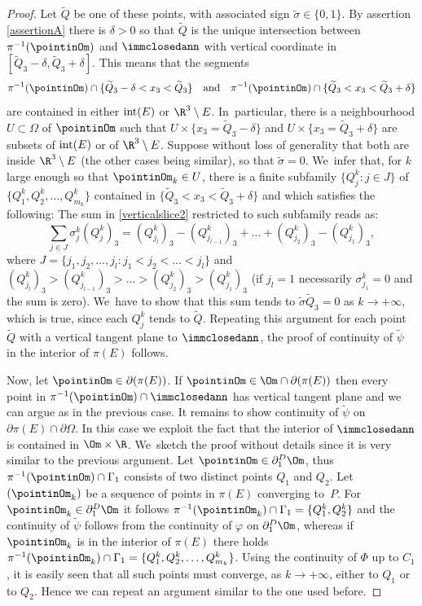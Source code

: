 \begin{proof}
Let $\widetilde Q$
be one of these points, with associated sign $\widetilde\sigma \in \{0,1\}$.
By assertion \ref{assertionA} there is $\delta>0$
so that $\widetilde Q$ is the unique intersection between $\pi^{-1}(\pointinOm)$ and
$\immclosedann$ with vertical coordinate in $[\widetilde Q_3-\delta,\widetilde Q_3+\delta]$.
This means that the segments
\[
\pi^{-1}(\pointinOm)\cap\{\widetilde Q_3-\delta<x_3<\widetilde Q_3\}\quad\text{and}\quad \pi^{-1}(\pointinOm)\cap\{\widetilde Q_3<x_3<\widetilde Q_3+\delta\}
\]
are contained in either $\textup{int}(E)$ or
$\R^3\setminus E$. In~particular,
there is a neighbourhood $U\subset\Omega$ of $\pointinOm$ such that $U\times \{x_3=\widetilde Q_3-\delta\}$ and $U\times \{x_3=\widetilde Q_3+\delta\}$ are
subsets of $\textup{int}(E)$ or of $\R^3\setminus E$. Suppose
without loss of generality that both are inside $\R^3\setminus E$ (the other cases being
similar),
so that $\widetilde \sigma=0$. We~infer that, for $k$ large enough so that $\pointinOm_k\in U$,
there is a finite subfamily $\{Q^k_j:j\in J\}$ of $\{Q^k_1,Q^k_2,\dots,Q^k_{m_k}\}$ contained in $\{ \widetilde Q_3<x_3<\widetilde Q_3+\delta\}$ and which satisfies the following: The sum in \eqref{verticalslice2} restricted to such subfamily reads as:
\[
 \sum_{j\in J}\sigma^k_j (Q^k_j)_3=(Q^k_{j_l})_3-(Q^k_{j_{l-1}})_3+\dots+(Q^k_{j_2})_3-(Q^k_{j_1})_3,
\]
where
$J=\{j_1,j_2,\dots,j_l : j_1<j_2<\dots<j_l\}$ and $(Q^k_{j_l})_3>(Q^k_{j_{l-1}})_3>\dots>(Q^k_{j_2})_3>(Q^k_{j_1})_3$ (if $j_l=1$ necessarily $\sigma_{j_1}^k=0$ and the sum is zero). We~have to show that this sum tends to $\widetilde\sigma \widetilde Q_3=0$ as $k\to
+\infty$, which is true, since each $Q^k_j$ tends to $\widetilde Q$.
Repeating this argument for each point $\widetilde Q$
with a vertical tangent plane to $\immclosedann$,
the proof of continuity of $\widetilde\psi$ in the interior of $\pi(E)$ follows.

Now, let
$\pointinOm\in\partial(\pi(E))$. If $\pointinOm\in \Om
\cap \partial(\pi(E))$
then every point in $\pi^{-1}(\pointinOm)\cap \immclosedann$ has vertical tangent plane
and we can argue as in the previous case.
It remains to show continuity of $\widetilde \psi$
on $\partial\pi(E)\cap \partial\Omega$. In this case we
exploit the fact that the interior of
$\immclosedann$ is contained in $\Om\times \R$. We~sketch the proof without details since it is very similar to the previous argument. Let
$\pointinOm\in \partial_1^D\Om$,
thus $\pi^{-1}(\pointinOm)\cap\Gamma_1$ consists of two distinct points
$Q_1$ and $Q_2$. Let $(\pointinOm_k)$
be a sequence of points in ${\pi(E)}$
converging to~$P$.
For $\pointinOm_k \in \partial^D_1\Om$ it follows $\pi^{-1}(\pointinOm_k)
\cap\Gamma_1=\{Q^k_1,Q^k_2\}$ and the continuity of $\widetilde\psi$
follows from the continuity of $\varphi$ on $\partial^D_1\Om$,
whereas if $\pointinOm_k$
is in the interior of $\pi(E)$ there holds $\pi^{-1}(\pointinOm_k)
\cap\Gamma_1=\{Q^k_1,Q^k_2,\dots, Q^k_{m_k}\}$.
Using the continuity of $\Phi$ up to $C_1$, it is easily seen that all such points must converge,
as $k\to +\infty$, either to $Q_1$ or to $Q_2$.
Hence we can repeat an argument similar to the one used before.
\end{proof}

